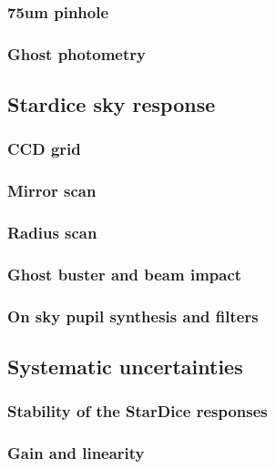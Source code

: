\documentclass[printer]{aa}
\begin{document}
\subsubsection{75um pinhole}

\subsubsection{Ghost photometry}

\subsection{Stardice sky response}

\subsubsection{CCD grid}

\subsubsection{Mirror scan}

\subsubsection{Radius scan}

\subsubsection{Ghost buster and beam impact}

\subsubsection{On sky pupil synthesis and filters}



\subsection{Systematic uncertainties}
\label{sec:systematics}

\subsubsection{Stability of the StarDice responses}

\subsubsection{Gain and linearity}
\label{sec:gain}
\end{document}
